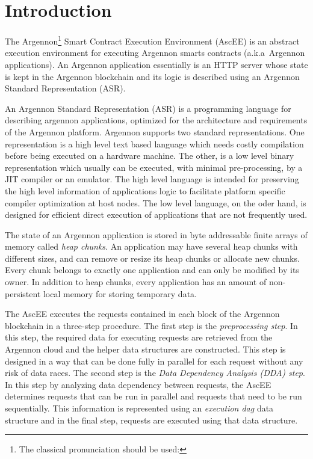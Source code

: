 

\section{Introduction}\label{sec:introduction}

The Argennon\footnote{The classical pronunciation should be used:} Smart Contract Execution
Environment (AscEE) is an abstract execution environment for executing Argennon smarts contracts (a.k.a\ Argennon
applications). An Argennon application essentially is an HTTP server whose state is kept in the Argennon blockchain and
its logic is described using an Argennon Standard Representation (ASR).

An Argennon Standard Representation (ASR) is a programming language for describing argennon applications, optimized
for the architecture and requirements of the Argennon platform.
Argennon supports two standard representations. One representation is a high level text based language which needs
costly compilation before being executed on a hardware machine. The other, is a low level binary representation which
usually can be executed, with minimal pre-processing, by a JIT compiler or an emulator. The high level
language is intended for preserving the high level information of applications logic to facilitate
platform specific compiler optimization at host nodes. The low level language, on the oder hand, is designed for
efficient direct execution of applications that are not frequently used.

The state of an Argennon application is stored in byte addressable finite arrays of memory called
\emph{heap chunks}. An application may have several heap chunks with different sizes, and can remove or
resize its heap chunks or allocate new chunks. Every chunk belongs to exactly one application and can only be modified
by its owner. In addition to heap chunks, every application has an amount of non-persistent local memory for
storing temporary data.

The AscEE executes the requests contained in each block of the Argennon
blockchain in a three-step procedure. The first step is the \emph{preprocessing step}. In this step, the required
data for executing requests are retrieved from the Argennon cloud and the helper data structures are constructed.
This step is
designed in a way that can be done fully in parallel for each request without any risk of data races. The second
step is the \emph{Data Dependency Analysis (DDA) step}.
In this step by analyzing data dependency between requests, the AscEE determines requests that can be run in parallel
and requests that need to be run sequentially. This information is represented using an \emph{execution dag} data
structure and in the final step, requests are executed using that data structure.


